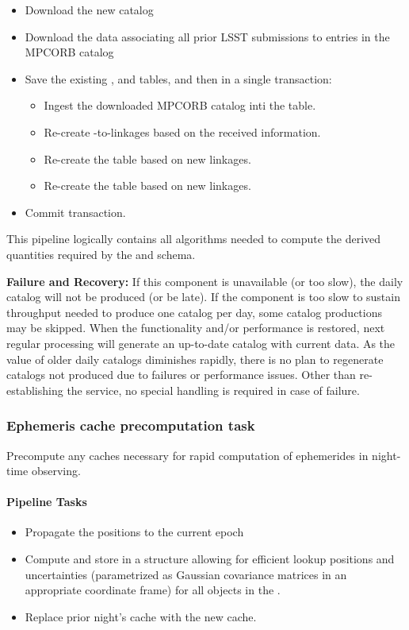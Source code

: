 \begin{itemize}
	\item Download the new \MPCORB catalog
	\item Download the data associating all prior LSST submissions to entries in the MPCORB catalog
	\item Save the existing \MPCORB, \SSObject and \SSSource tables, and then in a single transaction:
	\begin{itemize}
		\item Ingest the downloaded MPCORB catalog inti the \MPCORB table.
		\item Re-create \DIASource-to-\MPCORB linkages based on the received information.
		\item Re-create the \SSObject table based on new linkages.
		\item Re-create the \SSSource table based on new linkages.
	\end{itemize}
	\item Commit transaction.
\end{itemize}

This pipeline logically contains all algorithms needed to compute the derived quantities required by the \SSObject and \SSSource schema.

{\bf Failure and Recovery:} If this component is unavailable (or too slow), the daily catalog will not be produced (or be late). If the component is too slow to sustain throughput needed to produce one catalog per day, some catalog productions may be skipped. When the functionality and/or performance is restored, next regular processing will generate an up-to-date catalog with current data. As the value of older daily catalogs diminishes rapidly, there is no plan to regenerate catalogs not produced due to failures or performance issues. Other than re-establishing the service, no special handling is required in case of failure.

\subsubsection{Ephemeris cache precomputation task}

Precompute any caches necessary for rapid computation of ephemerides in night-time observing.

\paragraph{Pipeline Tasks}

\begin{itemize}
	\item Propagate the \MPCORB positions to the current epoch
	\item Compute and store in a structure allowing for efficient lookup positions and uncertainties (parametrized as Gaussian covariance matrices in an appropriate coordinate frame) for all objects in the \MPCORB.
	\item Replace prior night's cache with the new cache.
\end{itemize}


